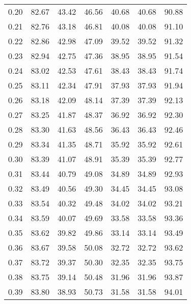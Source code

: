 \begin{tabular}{|c|c|c|c|c|c|c|}
      0.20 &     82.67 &     43.42 &      46.56 &   40.68 &      40.68 &         90.88 \\
      0.21 &     82.76 &     43.18 &      46.81 &   40.08 &      40.08 &         91.10 \\
      0.22 &     82.86 &     42.98 &      47.09 &   39.52 &      39.52 &         91.32 \\
      0.23 &     82.94 &     42.75 &      47.36 &   38.95 &      38.95 &         91.54 \\
      0.24 &     83.02 &     42.53 &      47.61 &   38.43 &      38.43 &         91.74 \\
      0.25 &     83.11 &     42.34 &      47.91 &   37.93 &      37.93 &         91.94 \\
      0.26 &     83.18 &     42.09 &      48.14 &   37.39 &      37.39 &         92.13 \\
      0.27 &     83.25 &     41.87 &      48.37 &   36.92 &      36.92 &         92.30 \\
      0.28 &     83.30 &     41.63 &      48.56 &   36.43 &      36.43 &         92.46 \\
      0.29 &     83.34 &     41.35 &      48.71 &   35.92 &      35.92 &         92.61 \\
      0.30 &     83.39 &     41.07 &      48.91 &   35.39 &      35.39 &         92.77 \\
      0.31 &     83.44 &     40.79 &      49.08 &   34.89 &      34.89 &         92.93 \\
      0.32 &     83.49 &     40.56 &      49.30 &   34.45 &      34.45 &         93.08 \\
      0.33 &     83.54 &     40.32 &      49.48 &   34.02 &      34.02 &         93.21 \\
      0.34 &     83.59 &     40.07 &      49.69 &   33.58 &      33.58 &         93.36 \\
      0.35 &     83.62 &     39.82 &      49.86 &   33.14 &      33.14 &         93.49 \\
      0.36 &     83.67 &     39.58 &      50.08 &   32.72 &      32.72 &         93.62 \\
      0.37 &     83.72 &     39.37 &      50.30 &   32.35 &      32.35 &         93.75 \\
      0.38 &     83.75 &     39.14 &      50.48 &   31.96 &      31.96 &         93.87 \\
      0.39 &     83.80 &     38.93 &      50.73 &   31.58 &      31.58 &         94.01 \\

\end{tabular}
